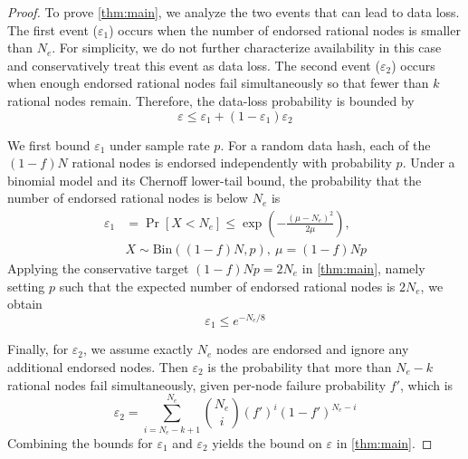 \begin{proof}
To prove \cref{thm:main}, we analyze the two events that can lead to data loss.
The first event ($\varepsilon_1$) occurs when the number of endorsed rational nodes is smaller than $N_e$.
For simplicity, we do not further characterize availability in this case and conservatively treat this event as data loss.
The second event ($\varepsilon_2$) occurs when enough endorsed rational nodes fail simultaneously so that fewer than $k$ rational nodes remain.
Therefore, the data-loss probability is bounded by
$$\varepsilon\leq \varepsilon_1+(1-\varepsilon_1)\varepsilon_2$$

We first bound $\varepsilon_1$ under sample rate $p$.
For a random data hash, each of the $(1-f)N$ rational nodes is endorsed independently with probability $p$.
Under a binomial model and its Chernoff lower-tail bound, the probability that the number of endorsed rational nodes is below $N_e$ is
$$
\begin{aligned}
\varepsilon_1
&=\Pr[X<N_e]\le\exp\!\left(-\frac{(\mu-N_e)^2}{2\mu}\right),\\
&X\sim\mathrm{Bin}((1-f)N,p),\ \mu=(1-f)Np
\end{aligned}
$$
Applying the conservative target $(1-f)Np=2N_e$ in \cref{thm:main}, namely setting $p$ such that the expected number of endorsed rational nodes is $2N_e$, we obtain
$$\varepsilon_1\le e^{-N_e/8}$$

Finally, for $\varepsilon_2$, we assume exactly $N_e$ nodes are endorsed and ignore any additional endorsed nodes.
Then $\varepsilon_2$ is the probability that more than $N_e-k$ rational nodes fail simultaneously, given per-node failure probability $f'$, which is
$$
\varepsilon_2=
\sum_{i=N_e-k+1}^{N_e}
\binom{N_e}{i}(f')^i(1-f')^{N_e-i}
$$
Combining the bounds for $\varepsilon_1$ and $\varepsilon_2$ yields the bound on $\varepsilon$ in \cref{thm:main}.
\end{proof}
